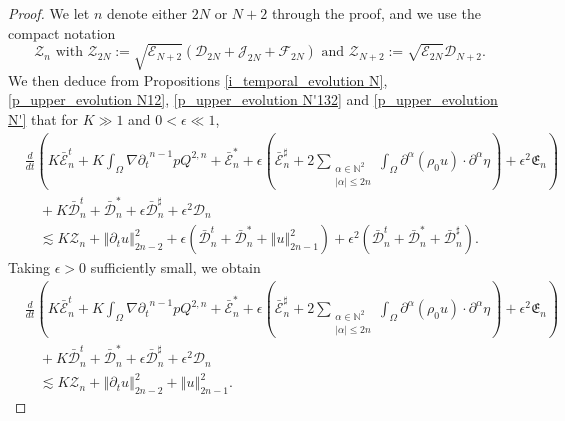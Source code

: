 \documentclass[a4paper,reqno,11pt]{amsart}
\numberwithin{equation}{section}
\providecommand{\norm}[1]{\left\Vert#1\right\Vert}
\providecommand{\sd}[1]{\mathcal{D}_{#1}}
\providecommand{\se}[1]{\mathcal{E}_{#1}}
\providecommand{\norm}[1]{\left\Vert#1\right\Vert}
\begin{document}
\begin{proof}
We let $n$ denote either $2N$ or $N+2$ through the proof, and we use the compact notation
\begin{equation}
\mathcal{Z}_n \text{ with }\mathcal{Z}_{2N}:=\sqrt{ \se{N+2}  }(\sd{ 2N}+  \mathcal{J}_{2N} +{\mathcal{F}_{2N}})\text{ and }\mathcal{Z}_{N+2}:=\sqrt{ \se{2N}  }\sd{ N+2} .
\end{equation}
We then deduce from Propositions \ref{i_temporal_evolution  N}, \ref{p_upper_evolution  N12}, \ref{p_upper_evolution  N'132} and \ref{p_upper_evolution  N'} that for $K\gg1$ and $0<\epsilon\ll 1$,
\begin{equation} \label{i_te_02n}
\begin{split}
 & \frac{d}{dt}\left(K\bar{\mathcal{E}}_{n}^t+K\int_\Omega  \nabla {\partial_t}^{n-1} p  Q^{2,n}+ \bar{\mathcal{E}}_{n}^*+\epsilon\left( \bar{\mathcal{E}}_{n}^\sharp+2\sum_{\substack{{\alpha}\in \mathbb{N}^2\\  |{\alpha}|\le 2n}}\int_\Omega \partial^\alpha ( \rho_0   u )\cdot \partial^\alpha  \eta\right)+\epsilon^2 \mathfrak{E}_{n}\right)
 \\&\quad + K\bar{\mathcal{D}}_{n}^t+\bar{\mathcal{D}}_{n}^*+\epsilon \bar{\mathcal{D}}_{n}^\sharp+\epsilon^2  {\mathcal{D}}_{n}
 \\&\quad {\lesssim}   K \mathcal{Z}_n+\norm{{\partial_t} u}_{2n-2}^2+\epsilon(\bar{\mathcal{D}}_{n}^t+\bar{\mathcal{D}}_{n}^{\ast}+\norm{  u}_{2n-1}^2)+\epsilon^2(\bar{\mathcal{D}}_{n}^t+\bar{\mathcal{D}}_{n}^*+ \bar{\mathcal{D}}_{n}^\sharp).
  \end{split}
\end{equation}
Taking $\epsilon>0$ sufficiently small, we obtain
\begin{equation} \label{i_te_02n1}
\begin{split}
 & \frac{d}{dt}\left(K\bar{\mathcal{E}}_{n}^t+K\int_\Omega  \nabla {\partial_t}^{n-1} p  Q^{2,n}+ \bar{\mathcal{E}}_{n}^*+\epsilon\left( \bar{\mathcal{E}}_{n}^\sharp+2\sum_{\substack{{\alpha}\in \mathbb{N}^2\\  |{\alpha}|\le 2n}}\int_\Omega \partial^\alpha ( \rho_0   u )\cdot \partial^\alpha  \eta\right)+\epsilon^2 \mathfrak{E}_{n}\right)
 \\&\quad + K\bar{\mathcal{D}}_{n}^t+\bar{\mathcal{D}}_{n}^*+\epsilon \bar{\mathcal{D}}_{n}^\sharp+\epsilon^2  {\mathcal{D}}_{n}\\&\quad {\lesssim}    K \mathcal{Z}_n+\norm{{\partial_t} u}_{2n-2}^2+ \norm{  u}_{2n-1}^2 .
  \end{split}

\end{equation}
\end{proof}
\end{document}
